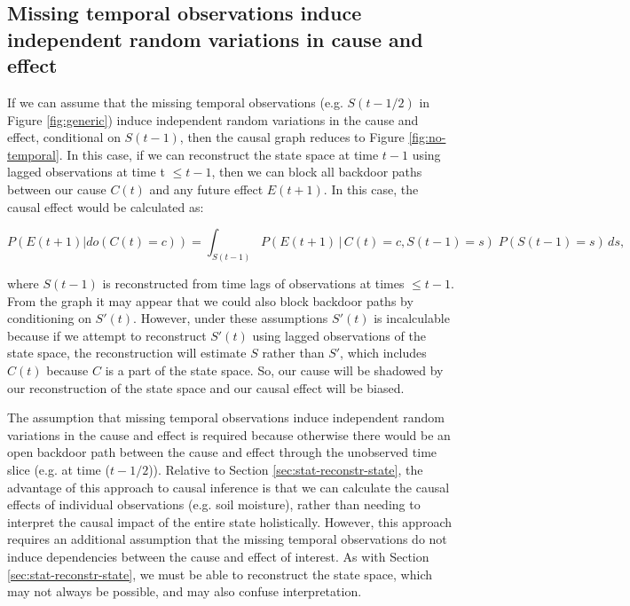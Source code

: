 \documentclass[12pt]{article}
\begin{document}
\subsection{Missing temporal observations induce independent random
  variations in cause and effect}
\label{sec:miss-temp-observ}

If we can assume that the missing temporal observations
(e.g. $S(t-1/2)$ in Figure \ref{fig:generic}) induce independent
random variations in the cause and effect, conditional on $S(t-1)$,
then the causal graph reduces to Figure \ref{fig:no-temporal}. In this
case, if we can reconstruct the state space at time $t-1$ using lagged
observations at time t $\leq t-1$, then we can block all backdoor
paths between our cause $C(t)$ and any future effect $E(t+1)$. In this
case, the causal effect would be calculated as:

\begin{equation}
  P(E(t+1)| do(C(t)=c)) = \int_{S(t-1)} P(E(t+1) \, | \, C(t)=c,
  S(t-1) = s
  )\; P(S(t-1)=s) \, d s,
\end{equation}

where $S(t-1)$ is reconstructed from time lags of observations at
times $\leq t-1$. From the graph it may appear that we could also
block backdoor paths by conditioning on $S'(t)$. However, under these
assumptions $S'(t)$ is incalculable because if we attempt to
reconstruct $S'(t)$ using lagged observations of the state space, the
reconstruction will estimate $S$ rather than $S'$, which includes
$C(t)$ because $C$ is a part of the state space. So, our cause will be
shadowed by our reconstruction of the state space and our causal
effect will be biased.

The assumption that missing temporal observations induce independent
random variations in the cause and effect is required because
otherwise there would be an open backdoor path between the cause and
effect through the unobserved time slice (e.g. at time
($t-1/2$)). Relative to Section \ref{sec:stat-reconstr-state}, the
advantage of this approach to causal inference is that we can
calculate the causal effects of individual observations (e.g. soil
moisture), rather than needing to interpret the causal impact of the
entire state holistically. However, this approach requires an
additional assumption that the missing temporal observations do not
induce dependencies between the cause and effect of interest. As with
Section \ref{sec:stat-reconstr-state}, we must be able to reconstruct
the state space, which may not always be possible, and may also
confuse interpretation.
\end{document}
